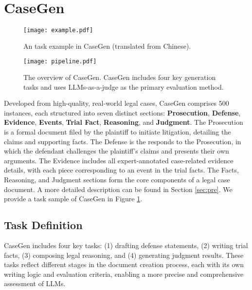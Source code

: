 \section{CaseGen}

\begin{figure}[t]
\centering
\texttt{[image: example.pdf]}
\caption{An task example in CaseGen (translated from Chinese).}
\label{figure:example}
\end{figure}





\begin{figure*}[t]
\centering
\vspace{-5mm}
\texttt{[image: pipeline.pdf]}
\caption{The overview of CaseGen. CaseGen includes four key generation tasks and uses LLMs-as-a-judge as the primary evaluation method.}
\label{figure:task}
\vspace{-5mm}
\end{figure*}

Developed from high-quality, real-world legal cases, CaseGen comprises 500 instances, each structured into seven distinct sections: \textbf{Prosecution}, \textbf{Defense}, \textbf{Evidence}, \textbf{Events}, \textbf{Trial Fact}, \textbf{Reasoning}, and \textbf{Judgment}.
The Prosecution is a formal document filed by the plaintiff to initiate litigation, detailing the claims and supporting facts.
The Defense is the responds to the Prosecution, in which the defendant challenges the plaintiff's claims and presents their own arguments.
The Evidence includes all expert-annotated case-related evidence details, with each piece corresponding to an event in the trial facts.
The Facts, Reasoning, and Judgment sections form the core components of a legal case document. A more detailed description can be found in Section \ref{sec:pre}. We provide a task sample of CaseGen in Figure \ref{figure:example}.




\subsection{Task Definition}
CaseGen includes four key tasks: (1) drafting defense statements, (2) writing trial facts, (3) composing legal reasoning, and (4) generating judgment results. 
These tasks reflect different stages in the document creation process, each with its own writing logic and evaluation criteria, enabling a more precise and comprehensive assessment of LLMs.


